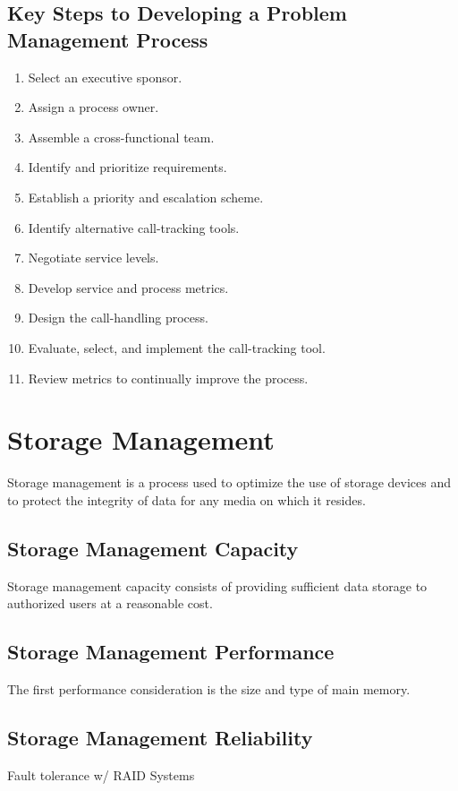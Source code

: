 \documentclass[a4]{article}
\begin{document}
\begin{multicols}{3}
\subsection{Key Steps to Developing a Problem Management Process}
\begin{enumerate}
\item Select an executive sponsor.
\item Assign a process owner.
\item Assemble a cross-functional team.
\item Identify and prioritize requirements.
\item Establish a priority and escalation scheme.
\item Identify alternative call-tracking tools.
\item Negotiate service levels.
\item Develop service and process metrics.
\item Design the call-handling process.
\item Evaluate, select, and implement the call-tracking tool.
\item Review metrics to continually improve the process.
\end{enumerate}

\section{Storage Management}
Storage management is a process used to optimize the use of storage devices and to protect the integrity of data 
for any media on which it resides.

\subsection{Storage Management Capacity}
Storage management capacity consists of providing sufficient data storage to authorized users at a reasonable cost.

\subsection{Storage Management Performance}
The first performance consideration is the size and type of main memory.

\subsection{Storage Management Reliability}
Fault tolerance w/ RAID Systems


\end{multicols}
\end{document}
